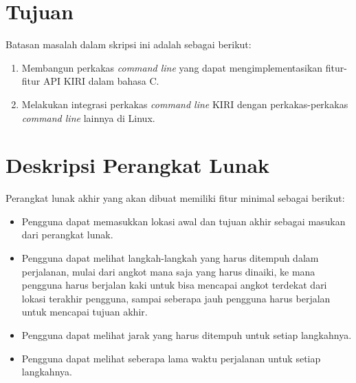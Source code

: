 \documentclass[a4paper,twoside]{article}
\begin{document}
\section{Tujuan}
\label{sec:tujuan}
Batasan masalah dalam skripsi ini adalah sebagai berikut:
\begin{enumerate}
	\item Membangun perkakas \textit{command line} yang dapat mengimplementasikan fitur-fitur API KIRI dalam bahasa C.
	\item Melakukan integrasi perkakas \textit{command line} KIRI dengan perkakas-perkakas \textit{command line} lainnya di Linux.
\end{enumerate}

\section{Deskripsi Perangkat Lunak}
\label{sec:description}
Perangkat lunak akhir yang akan dibuat memiliki fitur minimal sebagai berikut:
\begin{itemize}
	\item Pengguna dapat memasukkan lokasi awal dan tujuan akhir sebagai masukan dari perangkat lunak.
	\item Pengguna dapat melihat langkah-langkah yang harus ditempuh dalam perjalanan, mulai dari angkot mana saja yang harus dinaiki, ke mana pengguna harus berjalan kaki untuk bisa mencapai angkot terdekat dari lokasi terakhir pengguna, sampai seberapa jauh pengguna harus berjalan untuk mencapai tujuan akhir.
	\item Pengguna dapat melihat jarak yang harus ditempuh untuk setiap langkahnya.
	\item Pengguna dapat melihat seberapa lama waktu perjalanan untuk setiap langkahnya.
\end{itemize}
\end{document}
